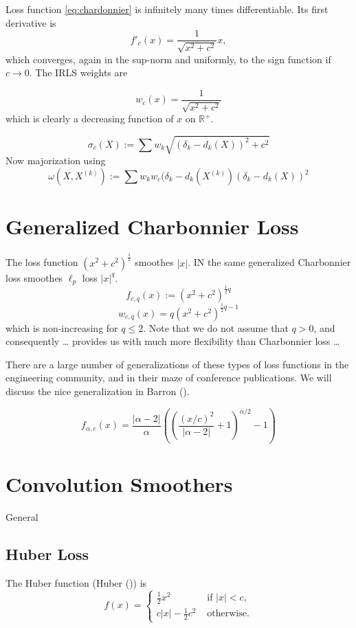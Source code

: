 \documentclass[
  12pt,
  letterpaper,
  DIV=11,
  numbers=noendperiod]{scrartcl}
\newcommand{\sectionbreak}{\pagebreak}
\begin{document}
Loss function \eqref{eq:chardonnier} is infinitely many times
differentiable. Its first derivative is \[
f'_c(x)=\frac{1}{\sqrt{x^2+c^2}}x,
\] which converges, again in the sup-norm and uniformly, to the sign
function if \(c\rightarrow 0\). The IRLS weights are

\[
w_c(x)=\frac{1}{\sqrt{x^2+c^2}}
\] which is clearly a decreasing function of \(x\) on \(\mathbb{R}^+\).

\[
\sigma_c(X):=\sum w_k\sqrt{(\delta_k-d_k(X))^2+c^2}
\] Now majorization using \[
\omega(X,X^{(k)}):=\sum w_kw_c(\delta_k-d_k(X^{(k)})(\delta_k-d_k(X))^2
\]

\sectionbreak

\section{Generalized Charbonnier
Loss}\label{generalized-charbonnier-loss}

The loss function \((x^2+c^2)^\frac12\) smoothes \(|x|\). IN the same
generalized Charbonnier loss smoothes \(\ell_p\) loss \(|x|^q\). \[
f_{c,q}(x):=(x^2+c^2)^{\frac12q}
\] \[
w_{c,q}(x)=q(x^2+c^2)^{\frac12q-1}
\] which is non-increasing for \(q\leq 2\). Note that we do not assume
that \(q>0\), and consequently \ldots{} provides us with much more
flexibility than Charbonnier loss \ldots{}

There are a large number of generalizations of these types of loss
functions in the engineering community, and in their maze of conference
publications. We will discuss the nice generalization in Barron
().

\[
f_{\alpha,c}(x)=\frac{|\alpha-2|}{\alpha}\left(\left(\frac{(x/c)^2}{|\alpha-2|}+1\right)^{\alpha/2}-1\right)
\]

\sectionbreak

\section{Convolution Smoothers}\label{convolution-smoothers}

General

\subsection{Huber Loss}\label{huber-loss}

The Huber function (Huber ()) is \[
f(x)=\begin{cases}
\frac12x^2&\text{ if }|x|<c,\\
c|x|-\frac12 c^2&\text{ otherwise}.
\end{cases}
\]
\end{document}
